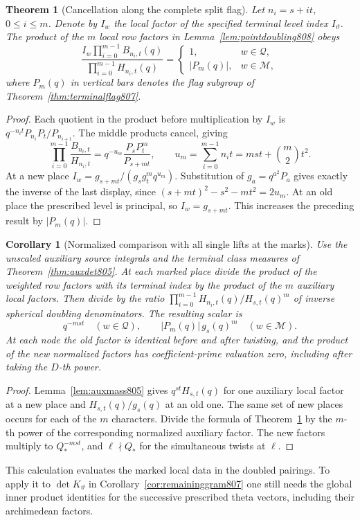 \documentclass[a4paper,11pt]{article}
\newtheorem{theorem}[proposition]{Theorem}
\newtheorem{corollary}[proposition]{Corollary}
\theoremstyle{definition}
\theoremstyle{remark}
\numberwithin{equation}{section}
\begin{document}
\begin{theorem}[Cancellation along the complete split flag]
\leavevmode\label{thm:flagdoubling808}
Let \(n_i=s+it\), \(0\le i\le m\). Denote by \(I_w\) the local
factor of the specified terminal level index \(I_\vartheta\).
The product of the \(m\) local row factors in
Lemma~\ref{lem:pointdoubling808} obeys
\[
   \frac{I_w\displaystyle\prod_{i=0}^{m-1} B_{n_i,t}(q)}
        {\displaystyle\prod_{i=0}^{m-1} H_{n_i,t}(q)}
    =
    \begin{cases}
       1, & w\in\mathcal Q,\\
       |P_m(q)|, & w\in\mathcal M ,
    \end{cases}
\]
where \(P_m(q)\) in vertical bars denotes the flag subgroup
of Theorem~\ref{thm:terminalflag807}.
\end{theorem}
\begin{proof}
Each quotient in the product before multiplication by \(I_w\)
is \(q^{-n_it}P_{n_i}P_t/P_{n_{i+1}}\). The middle products
cancel, giving
\[
         \prod_{i=0}^{m-1}\frac{B_{n_i,t}}{H_{n_i,t}}
            =q^{-u_m}\frac{P_s P_t^m}{P_{s+mt}},
       \qquad u_m=\sum_{i=0}^{m-1}n_it
                         =mst+\binom{m}{2}t^2 .
\]
At a new place \(I_w=g_{s+mt}/(g_sg_t^m q^{u_m})\).
Substitution of \(g_a=q^{a^2}P_a\) gives exactly the inverse
of the last display, since
\((s+mt)^2-s^2-mt^2=2u_m\). At an old place the prescribed
level is principal, so \(I_w=g_{s+mt}\). This increases the
preceding result by \(|P_m(q)|\).
\end{proof}

\begin{corollary}[Normalized comparison with all single lifts at the marks]
\leavevmode\label{cor:flagunit808}
Use the unscaled auxiliary source integrals and the terminal
class measures of Theorem~\ref{thm:auxdet805}. At each marked
place divide the product of the weighted row factors with its
terminal index by the product of the \(m\) auxiliary local
factors. Then divide by the ratio
\(\prod_{i=0}^{m-1}H_{n_i,t}(q)/H_{s,t}(q)^m\) of inverse
spherical doubling denominators. The resulting scalar is
\[
       q^{-mst}\quad(w\in\mathcal Q),\qquad
       |P_m(q)|\,g_s(q)^m\quad(w\in\mathcal M).
\]
At each node the old factor is identical before and after
twisting, and the product of the new normalized factors has
coefficient-prime valuation zero, including after taking the
\(D\)-th power.
\end{corollary}
\begin{proof}
Lemma~\ref{lem:auxmass805} gives
\(q^{st}H_{s,t}(q)\) for one auxiliary local factor at a
new place and \(H_{s,t}(q)/g_s(q)\) at an old one. The same
set of new places occurs for each of the \(m\) characters.
Divide the formula of Theorem~\ref{thm:flagdoubling808} by
the \(m\)-th power of the corresponding normalized auxiliary
factor. The new factors multiply to \(Q_*^{-mst}\), and
\(\ell\nmid Q_*\) for the simultaneous twists at \(\ell\).
\end{proof}
This calculation evaluates the marked local data in the
doubled pairings. To apply it to \(\det K_\vartheta\) in
Corollary~\ref{cor:remaininggram807} one still needs the
global inner product identities for the successive prescribed
theta vectors, including their archimedean factors.
\clearpage
\end{document}
